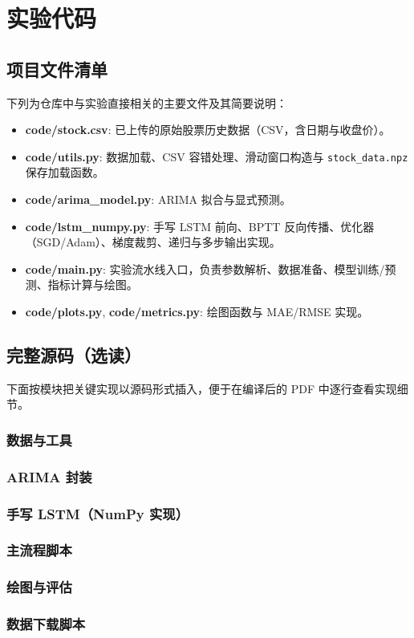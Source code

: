 \chapter{实验代码}

\section{项目文件清单}
下列为仓库中与实验直接相关的主要文件及其简要说明：
\begin{itemize}
	\item \textbf{code/stock.csv}: 已上传的原始股票历史数据（CSV，含日期与收盘价）。
	\item \textbf{code/utils.py}: 数据加载、CSV 容错处理、滑动窗口构造与 \texttt{stock\_data.npz} 保存加载函数。
	\item \textbf{code/arima\_model.py}: ARIMA 拟合与显式预测。
	\item \textbf{code/lstm\_numpy.py}: 手写 LSTM 前向、BPTT 反向传播、优化器（SGD/Adam）、梯度裁剪、递归与多步输出实现。
	\item \textbf{code/main.py}: 实验流水线入口，负责参数解析、数据准备、模型训练/预测、指标计算与绘图。
	\item \textbf{code/plots.py}, \textbf{code/metrics.py}: 绘图函数与 MAE/RMSE 实现。
\end{itemize}

\section{完整源码（选读）}
下面按模块把关键实现以源码形式插入，便于在编译后的 PDF 中逐行查看实现细节。

\subsection{数据与工具}


\subsection{ARIMA 封装}


\subsection{手写 LSTM（NumPy 实现）}


\subsection{主流程脚本}


\subsection{绘图与评估}



\subsection{数据下载脚本}




